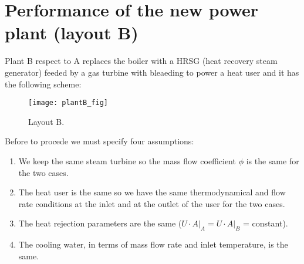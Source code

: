 \documentclass[a4paper,12pt]{article}
\begin{document}
\section{Performance of the new power plant (layout B) }
Plant B respect to A replaces the boiler with a HRSG (heat recovery steam generator) feeded by a gas turbine with bleaeding to power a heat user and it has the following scheme:

\begin{figure}[h]
  \caption{Layout B.}
  \centering
    \texttt{[image: plantB\_fig]}
\end{figure}

Before to procede we must specify four assumptions:
\begin{enumerate}
\item We keep the same steam turbine so the mass flow coefficient $\phi$ is the same for the two cases.
\item The heat user is the same so we have the same thermodynamical and flow rate conditions at the inlet and at the outlet of the user for the two cases.
\item The heat rejection parameters are the same ($\left.U \cdot A \right|_A = \left.U \cdot A \right|_B$ = constant). 
\item The cooling water, in terms of mass flow rate and inlet temperature, is the same.
\end{enumerate}
\end{document}
